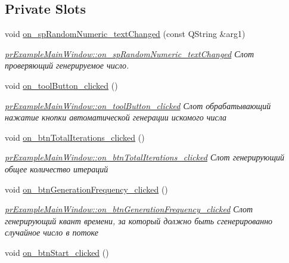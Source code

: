 \subsection*{Private Slots}
\begin{DoxyCompactItemize}
\item 
void \hyperlink{classpr_example_main_window_a2b65976cef6b714c6310ffb7156001c0}{on\+\_\+sp\+Random\+Numeric\+\_\+text\+Changed} (const Q\+String \&arg1)
\begin{DoxyCompactList}\small\item\em \hyperlink{classpr_example_main_window_a2b65976cef6b714c6310ffb7156001c0}{pr\+Example\+Main\+Window\+::on\+\_\+sp\+Random\+Numeric\+\_\+text\+Changed} Слот проверяющий генерируемое число. \end{DoxyCompactList}\item 
void \hyperlink{classpr_example_main_window_a0ea28061dcfe0502e84873ca91553a8b}{on\+\_\+tool\+Button\+\_\+clicked} ()
\begin{DoxyCompactList}\small\item\em \hyperlink{classpr_example_main_window_a0ea28061dcfe0502e84873ca91553a8b}{pr\+Example\+Main\+Window\+::on\+\_\+tool\+Button\+\_\+clicked} Слот обрабатывающий нажатие кнопки автоматической генерации искомого числа \end{DoxyCompactList}\item 
void \hyperlink{classpr_example_main_window_a3868049ba73b562b78b1518114bd26b0}{on\+\_\+btn\+Total\+Iterations\+\_\+clicked} ()
\begin{DoxyCompactList}\small\item\em \hyperlink{classpr_example_main_window_a3868049ba73b562b78b1518114bd26b0}{pr\+Example\+Main\+Window\+::on\+\_\+btn\+Total\+Iterations\+\_\+clicked} Слот генерирующий общее количество итераций \end{DoxyCompactList}\item 
void \hyperlink{classpr_example_main_window_ae70fafa427f7bf3c30683ad3e3760d12}{on\+\_\+btn\+Generation\+Frequency\+\_\+clicked} ()
\begin{DoxyCompactList}\small\item\em \hyperlink{classpr_example_main_window_ae70fafa427f7bf3c30683ad3e3760d12}{pr\+Example\+Main\+Window\+::on\+\_\+btn\+Generation\+Frequency\+\_\+clicked} Слот генерирующий квант времени, за который должно быть сгенерированно случайное число в потоке \end{DoxyCompactList}\item 
void \hyperlink{classpr_example_main_window_a9c6a9bfaa53a655479b13d8da936c9ab}{on\+\_\+btn\+Start\+\_\+clicked} ()

\end{DoxyCompactItemize}
